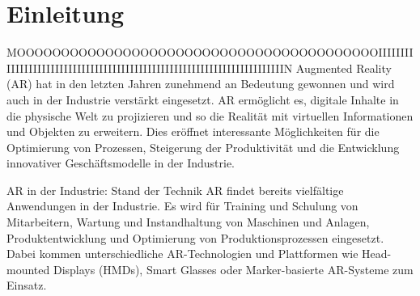 \section{Einleitung}
MOOOOOOOOOOOOOOOOOOOOOOOOOOOOOOOOOOOOOOOOOIIIIIIIIIIIIIIIIIIIIIIIIIIIIIIIIIIIIIIIIIIIIIIIIIIIIIIIIIIIIIIIIIIIIIIIN
Augmented Reality (AR) hat in den letzten Jahren zunehmend an Bedeutung
gewonnen und wird auch in der Industrie verstärkt eingesetzt. AR ermöglicht es,
digitale Inhalte in die physische Welt zu projizieren und so die Realität mit
virtuellen Informationen und Objekten zu erweitern. Dies eröffnet interessante
Möglichkeiten für die Optimierung von Prozessen, Steigerung der Produktivität
und die Entwicklung innovativer Geschäftsmodelle in der Industrie.

AR in der Industrie: Stand der Technik AR findet bereits vielfältige
Anwendungen in der Industrie. Es wird für Training und Schulung von
Mitarbeitern, Wartung und Instandhaltung von Maschinen und Anlagen,
Produktentwicklung und Optimierung von Produktionsprozessen eingesetzt. Dabei
kommen unterschiedliche AR-Technologien und Plattformen wie Head-mounted
Displays (HMDs), Smart Glasses oder Marker-basierte AR-Systeme zum Einsatz.
